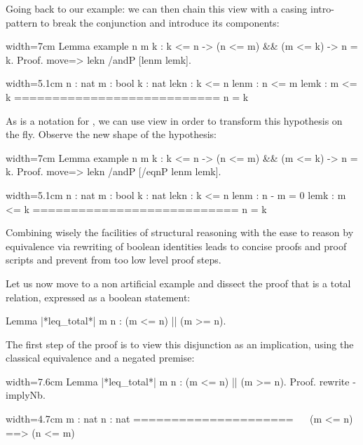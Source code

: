 
Going back to  our example: we can then chain this view with a casing
intro-pattern to break the conjunction and introduce its components:

\begin{coq}{}{width=7cm}
Lemma example n m k :
  k <= n -> (n <= m) && (m <= k) -> n = k.
Proof.
move=> lekn /andP [lenm lemk].
\end{coq}
\begin{coqout}{}{width=5.1cm}
n : nat
m : bool
k : nat
lekn : k <= n
lenm : n <= m
lemk : m <= k
===========================
n = k
\end{coqout}

As  is a notation for , we can use view
 in order to transform this hypothesis on the fly. Observe the
new shape of the  hypothesis:

\begin{coq}{}{width=7cm}
Lemma example n m k :
  k <= n -> (n <= m) && (m <= k) -> n = k.
Proof.
move=> lekn /andP [/eqnP lenm lemk].
\end{coq}
\begin{coqout}{}{width=5.1cm}
n : nat
m : bool
k : nat
lekn : k <= n
lenm : n - m = 0
lemk : m <= k
===========================
n = k
\end{coqout}

Combining wisely the facilities of  structural reasoning with
the ease to reason by equivalence via rewriting of boolean identities
leads to concise proofs and proof scripts and prevent from too low
level proof steps. 

Let us now move to a non artificial example and dissect the proof that
\C{(_ <= _)} is a total relation, expressed as a boolean statement:

\begin{coq}{}{}
Lemma |*leq_total*| m n : (m <= n) || (m >= n).
\end{coq}

The first step of the proof is to view this disjunction as an
implication, using the classical equivalence and a negated premise:

\begin{coq}{}{width=7.6cm}
Lemma |*leq_total*| m n : (m <= n) || (m >= n).
Proof.
rewrite -implyNb.
\end{coq}
\begin{coqout}{}{width=4.7cm}
m : nat
n : nat
=====================
~~ (m <= n) ==> (n <= m)
\end{coqout}

